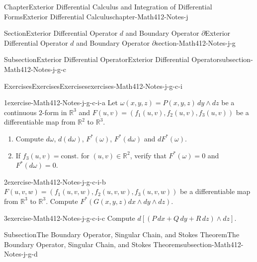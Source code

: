 \documentclass[oneside,10pt,]{book}
\numberwithin{equation}{section}
\newcommand{\bbR}{\mathbb{R}}
\begin{document}
\begin{chapterptx}{Chapter}{Exterior Differential Calculus and Integration of Differential Forms}{}{Exterior Differential Calculus}{}{}{chapter-Math412-Notes-j}
\begin{sectionptx}{Section}{Exterior Differential Operator \(d\) and Boundary Operator \(\partial\)}{}{Exterior Differential Operator \(d\) and Boundary Operator \(\partial\)}{}{}{section-Math412-Notes-j-g}
\begin{subsectionptx}{Subsection}{Exterior Differential Operator}{}{Exterior Differential Operator}{}{}{subsection-Math412-Notes-j-g-c}
%
%
\typeout{************************************************}
\typeout{************************************************}
%
\begin{exercises-subsubsection-numberless}{Exercises}{Exercises}{}{Exercises}{}{}{exercises-Math412-Notes-j-g-c-i}
\begin{divisionexercise}{1}{}{}{exercise-Math412-Notes-j-g-c-i-a}%
Let \(\omega (x, y ,z)=P(x, y, z)\, dy\wedge dz\) be a continuous \(2\)-form in \(\bbR^{3}\) and \(F(u, v)=(f_{1}(u, v), f_{2}(u, v), f_{3}(u, v))\) be a differentiable map from \(\bbR^{2}\) to \(\bbR^{3}\).%
\begin{enumerate}[label=(\alph*)]
\item{}Compute \(d\omega\),  \(d(d\omega)\), \(F^{*}(\omega)\), \(F^{*}(d \omega)\) and \(d F^{*}(\omega)\).%
\item{}If \(f_{3}(u, v)=\text{const.}\) for \((u, v)\in \bbR^{2}\), verify that \(F^{*}(\omega)=0\) and \(F^{*}(d \omega)=0\).%
\end{enumerate}
%
\end{divisionexercise}%
\begin{divisionexercise}{2}{}{}{exercise-Math412-Notes-j-g-c-i-b}%
\(F(u, v, w)=(f_{1}(u, v, w), f_{2}(u, v, w ), f_{3}(u, v, w))\) be a differentiable map from \(\bbR^{3}\) to \(\bbR^{3}\). Compute \(F^{*}\left( G(x, y, z) dx\wedge dy\wedge dz\right)\).%
\end{divisionexercise}%
\begin{divisionexercise}{3}{}{}{exercise-Math412-Notes-j-g-c-i-c}%
Compute \(d\left[ (P\, dx + Q \, dy +R \, dz)\wedge dz \right]\).%
\end{divisionexercise}%
\end{exercises-subsubsection-numberless}
\end{subsectionptx}
%
%
\typeout{************************************************}
\typeout{************************************************}
%
\begin{subsectionptx}{Subsection}{The Boundary Operator, Singular Chain, and Stokes Theorem}{}{The Boundary Operator, Singular Chain, and Stokes Theorem}{}{}{subsection-Math412-Notes-j-g-d}

\end{subsectionptx}
\end{sectionptx}
\end{chapterptx}
\end{document}

